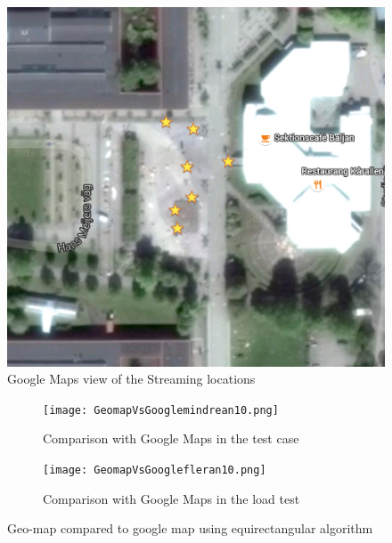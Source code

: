 \begin{figure}[ht!]
\begin{center}
	\includegraphics[scale=0.64]{Google_Maps.png}
	\caption{Google Maps view of the Streaming locations}
	\label{fig:googlemaps}
\end{center}
\end{figure}

\begin{figure}
\begin{subfigure}[b]{0.5\textwidth}
        \texttt{[image: GeomapVsGooglemindrean10.png]}
        \caption{Comparison with Google Maps in the test case}
        \label{fig:GeomapVsGoogleLessThan10objects}
    \end{subfigure}\hfill 
    \hspace{3px}
    \begin{subfigure}[b]{0.51\textwidth}
        \texttt{[image: GeomapVsGooglefleran10.png]}
        \caption{Comparison with Google Maps in the load test}
        \label{fig:tiger}
    \label{fig:GeomapVsGoogleMoreThan10objects}
    \end{subfigure}
	\caption{Geo-map compared to google map using equirectangular algorithm}
	\label{fig:GeomapVsGoogleWithLessThan10objects}
\end{figure}

